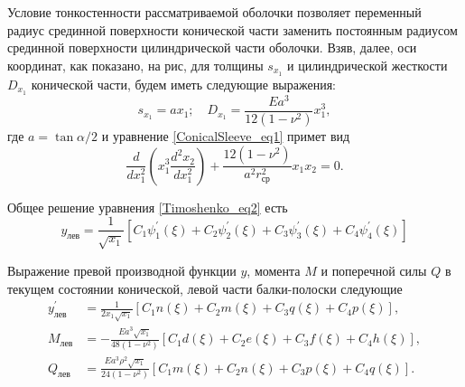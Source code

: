 Условие тонкостенности рассматриваемой оболочки позволяет переменный радиус срединной поверхности конической части заменить постоянным радиусом срединной поверхности цилиндрической части оболочки. 
Взяв, далее, оси координат, как показано, на рис, для толщины $s_{x_1}$ и цилиндрической жесткости $D_{x_1}$ конической части, будем иметь следующие выражения:
\begin{equation}
  \label{Timoshenko_eq1}
  s_{x_1}=ax_1; \quad D_{x_1}= \frac{Ea^3}{12 \left( 1- {\nu}^2 \right)}x_1^3,
\end{equation}
где $a= \tan{\alpha/2}$ и уравнение \eqref{ConicalSleeve_eq1} примет вид 
\begin{equation}
  \label{Timoshenko_eq2}
  \frac{d}{d x_1^2} \left( x_1^3 \frac{d^2 x_2}{dx_1^2} \right)+\frac{12 \left( 1- {\nu}^2 \right)}{a^2 r_{\text{ср}}^2}x_1x_2=0.  
\end{equation}

Общее решение уравнения \eqref{Timoshenko_eq2} есть 
\begin{equation}
  \label{Timoshenko_eq3}
  y_{\text{лев}}=\frac{1}{\sqrt{x_1}} \left[ C_1 \psi_1^{\prime}(\xi)+C_2 \psi_2^{\prime}(\xi)+C_3 \psi_3^{\prime}(\xi)+C_4 \psi_4^{\prime}(\xi) \right]  
\end{equation}

Выражение превой производной функции $y$, момента $M$ и поперечной силы $Q$ в текущем состоянии конической, левой части балки-полоски следующие
\begin{equation}
  \label{Timoshenko_eq4}
  \begin{split}
    y_{\text{лев}}^{\prime} &=\frac{1}{2 x_1 \sqrt{x_1}} \left[ C_1 n(\xi)+C_2 m(\xi)+C_3 q(\xi)+C_4 p(\xi) \right],\\
    M_{\text{лев}} &=-\frac{Ea^3 \sqrt{x_1}}{48 \left( 1- {\nu}^2 \right)} \left[ C_1 d(\xi)+C_2 e(\xi)+C_3 f(\xi)+C_4 h(\xi) \right],\\
    Q_{\text{лев}} &=\frac{Ea^3 {\rho}^2 \sqrt{x_1}}{24 \left( 1- {\nu}^2 \right)} \left[ C_1 m(\xi)+C_2 n(\xi)+C_3 p(\xi)+C_4 q(\xi) \right].
  \end{split}  
\end{equation}

